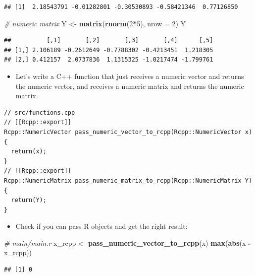 \documentclass[]{book}
\newenvironment{Shaded}{\begin{snugshade}}{\end{snugshade}}
\newcommand{\KeywordTok}[1]{\textcolor[rgb]{0.13,0.29,0.53}{\textbf{#1}}}
\newcommand{\DataTypeTok}[1]{\textcolor[rgb]{0.13,0.29,0.53}{#1}}
\newcommand{\DecValTok}[1]{\textcolor[rgb]{0.00,0.00,0.81}{#1}}
\newcommand{\StringTok}[1]{\textcolor[rgb]{0.31,0.60,0.02}{#1}}
\newcommand{\CommentTok}[1]{\textcolor[rgb]{0.56,0.35,0.01}{\textit{#1}}}
\newcommand{\OperatorTok}[1]{\textcolor[rgb]{0.81,0.36,0.00}{\textbf{#1}}}
\newcommand{\NormalTok}[1]{#1}
\providecommand{\tightlist}{%
  \setlength{\itemsep}{0pt}\setlength{\parskip}{0pt}}
\begin{document}
\begin{verbatim}
## [1]  2.18543791 -0.01282801 -0.30530893 -0.58421346  0.77126850
\end{verbatim}

\begin{Shaded}
\begin{Highlighting}[]
\CommentTok{# numeric matrix}
\NormalTok{Y <-}\StringTok{ }\KeywordTok{matrix}\NormalTok{(}\KeywordTok{rnorm}\NormalTok{(}\DecValTok{2}\OperatorTok{*}\DecValTok{5}\NormalTok{), }\DataTypeTok{nrow =} \DecValTok{2}\NormalTok{)}
\NormalTok{Y}
\end{Highlighting}
\end{Shaded}

\begin{verbatim}
##          [,1]       [,2]       [,3]       [,4]      [,5]
## [1,] 2.106189 -0.2612649 -0.7788302 -0.4213451  1.218305
## [2,] 0.412157  2.0737836  1.1315325 -1.0217474 -1.799761
\end{verbatim}

\begin{itemize}
\tightlist
\item
  Let's write a C++ function that just receives a numeric vector and
  returns the numeric vector, and receives a numeric matrix and returns
  the numeric matrix.
\end{itemize}

\begin{verbatim}
// src/functions.cpp
// [[Rcpp::export]]
Rcpp::NumericVector pass_numeric_vector_to_rcpp(Rcpp::NumericVector x) {
  return(x);
}
// [[Rcpp::export]]
Rcpp::NumericMatrix pass_numeric_matrix_to_rcpp(Rcpp::NumericMatrix Y) {
  return(Y);
}
\end{verbatim}

\begin{itemize}
\tightlist
\item
  Check if you can pass R objects and get the right result:
\end{itemize}

\begin{Shaded}
\begin{Highlighting}[]
\CommentTok{# main/main.r}
\NormalTok{x_rcpp <-}\StringTok{ }\KeywordTok{pass_numeric_vector_to_rcpp}\NormalTok{(x)}
\KeywordTok{max}\NormalTok{(}\KeywordTok{abs}\NormalTok{(x }\OperatorTok{-}\StringTok{ }\NormalTok{x_rcpp))}
\end{Highlighting}
\end{Shaded}

\begin{verbatim}
## [1] 0
\end{verbatim}
\end{document}
